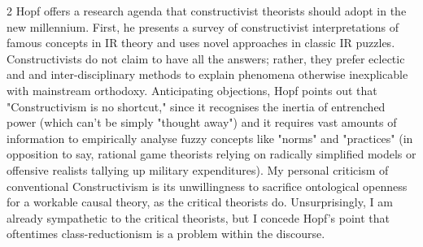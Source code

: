 \documentclass[letterpaper,12pt]{article}
\begin{document}
\begin {multicols}{2}
Hopf offers a research agenda that constructivist theorists should adopt in the new millennium. First, he presents a survey of constructivist interpretations of famous concepts in IR theory and uses novel approaches in classic IR puzzles. Constructivists do not claim to have all the answers; rather, they prefer eclectic and and inter-disciplinary methods to explain phenomena otherwise inexplicable with mainstream orthodoxy. Anticipating objections, Hopf points out that "Constructivism is no shortcut," since it recognises the inertia of entrenched power (which can't be simply "thought away") and it requires vast amounts of information to empirically analyse fuzzy concepts like "norms" and "practices" (in opposition to say, rational game theorists relying on radically simplified models or offensive realists tallying up military expenditures). My personal criticism of conventional Constructivism is its unwillingness to sacrifice ontological openness for a workable causal theory, as the critical theorists do. Unsurprisingly, I am already sympathetic to the critical theorists, but I concede Hopf's point that oftentimes class-reductionism is a problem within the discourse.

\end{multicols}
\end{document}
